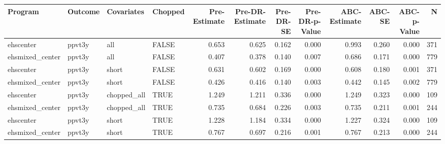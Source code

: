 \begin{table}[ht]
\centering
\begin{tabular}{llllrrrrrrrr}
  \hline
Program & Outcome & Covariates & Chopped & Pre-Estimate & Pre-DR-Estimate & Pre-DR-SE & Pre-DR-p-Value & ABC-Estimate & ABC-SE & ABC-p-Value & N \\ 
  \hline
ehscenter & ppvt3y & all & FALSE & 0.653 & 0.625 & 0.162 & 0.000 & 0.993 & 0.260 & 0.000 & 371 \\ 
  ehsmixed\_center & ppvt3y & all & FALSE & 0.407 & 0.378 & 0.140 & 0.007 & 0.686 & 0.171 & 0.000 & 779 \\ 
  ehscenter & ppvt3y & short & FALSE & 0.631 & 0.602 & 0.169 & 0.000 & 0.608 & 0.180 & 0.001 & 371 \\ 
  ehsmixed\_center & ppvt3y & short & FALSE & 0.426 & 0.416 & 0.140 & 0.003 & 0.442 & 0.145 & 0.002 & 779 \\ 
  ehscenter & ppvt3y & chopped\_all & TRUE & 1.249 & 1.211 & 0.336 & 0.000 & 1.249 & 0.323 & 0.000 & 109 \\ 
  ehsmixed\_center & ppvt3y & chopped\_all & TRUE & 0.735 & 0.684 & 0.226 & 0.003 & 0.735 & 0.211 & 0.001 & 244 \\ 
  ehscenter & ppvt3y & short & TRUE & 1.228 & 1.184 & 0.334 & 0.000 & 1.227 & 0.324 & 0.000 & 109 \\ 
  ehsmixed\_center & ppvt3y & short & TRUE & 0.767 & 0.697 & 0.216 & 0.001 & 0.767 & 0.213 & 0.000 & 244 \\ 
   \hline
\end{tabular}
\end{table}
